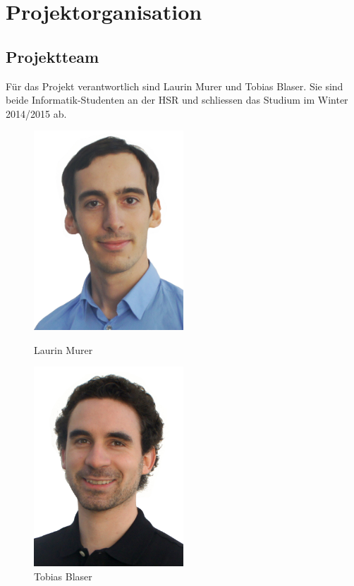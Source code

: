 \chapter{Projektorganisation}

	\section{Projektteam}
	Für das Projekt verantwortlich sind Laurin Murer und Tobias Blaser.
	Sie sind beide Informatik-Studenten an der HSR und schliessen das Studium im Winter 2014/2015 ab.
	\begin{figure}[H]
		\begin{minipage}[b]{0.5\linewidth}
			\includegraphics[width=0.5\textwidth]{projectPlan/media/img/lmurer.jpg}
			\centering
			\caption{Laurin Murer}
			\label{fig:laurinmurer}
		\end{minipage}
		\begin{minipage}[b]{0.5\linewidth}
			\includegraphics[width=0.5\textwidth]{projectPlan/media/img/tblaser.jpg}
			\centering
			\caption{Tobias Blaser}
			\label{fig:tobiasblaser}
		\end{minipage}
	\end{figure}

